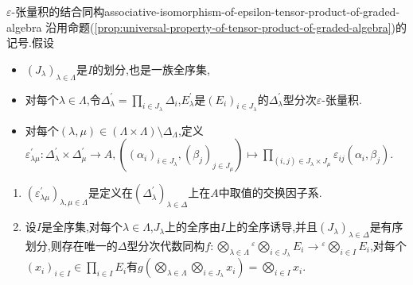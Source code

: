 \begin{proposition}{$\varepsilon$-张量积的结合同构}{associative-isomorphism-of-epsilon-tensor-product-of-graded-algebra}
	沿用命题(\ref{prop:universal-property-of-tensor-product-of-graded-algebra})的记号.假设
	\begin{itemize}
		\item $\left(J_{\lambda}\right)_{\lambda\in\Lambda}$是$I$的划分,也是一族全序集,
		\item 对每个$\lambda\in\Lambda$,令$\Delta_{\lambda}^{\prime}=\prod\limits_{i\in J_{\lambda}}\Delta_{i}$,$E_{\lambda}^{\prime}$是$\left(E_{i}\right)_{i\in J_{\lambda}}$的$\Delta_{\lambda}^{\prime}$型分次$\varepsilon$-张量积.
		\item 对每个$\left(\lambda,\mu\right)\in\left(\Lambda\times\Lambda\right)\setminus\Delta_{\Lambda}$,定义$\varepsilon_{\lambda\mu}^{\prime}:\Delta_{\lambda}^{\prime}\times\Delta_{\mu}^{\prime}\to A,\left(\left(\alpha_{i}\right)_{i\in J_{\lambda}},\left(\beta_{j}\right)_{j\in J_{\mu}}\right)\mapsto\prod\limits_{\left(i,j\right)\in J_{\lambda}\times J_{\mu}}\varepsilon_{ij}\left(\alpha_{i},\beta_{j}\right)$.
	\end{itemize}
	\begin{enumerate}
		\item $\left(\varepsilon_{\lambda\mu}^{\prime}\right)_{\lambda,\mu\in\Lambda}$是定义在$\left(\Delta_{\lambda}^{\prime}\right)_{\lambda\in\Delta}$上在$A$中取值的交换因子系.
		\item 设$I$是全序集,对每个$\lambda\in\Lambda$,$J_{\lambda}$上的全序由$I$上的全序诱导,并且$\left(J_{\lambda}\right)_{\lambda\in\Delta}$是有序划分,则存在唯一的$\Delta$型分次代数同构$f:\bigotimes\limits_{\lambda\in\Lambda}{}^{\varepsilon}\bigotimes\limits_{i\in J_{\lambda}}E_{i}\to{}^{\varepsilon}\bigotimes\limits_{i\in I}E_{i}$,对每个$\left(x_{i}\right)_{i\in I}\in\prod\limits_{i\in I}E_{i}$有$g\left(\bigotimes\limits_{\lambda\in\Lambda}\bigotimes\limits_{i\in J_{\lambda}}x_{i}\right)=\bigotimes\limits_{i\in I}x_{i}$.
	\end{enumerate}
\end{proposition}






































